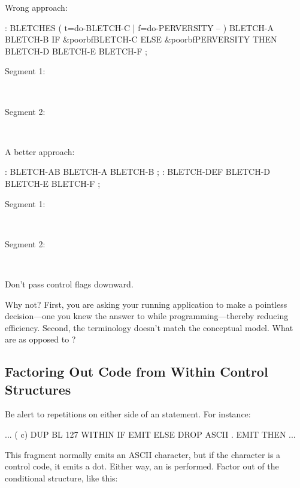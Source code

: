 \noindent Wrong approach:

\begin{Code}[commandchars=\&\{\}]
: BLETCHES  ( t=do-BLETCH-C | f=do-PERVERSITY -- ) 
   BLETCH-A  BLETCH-B  IF  &poorbf{BLETCH-C}  ELSE  &poorbf{PERVERSITY}
      THEN  BLETCH-D BLETCH-E BLETCH-F ;
\end{Code}

\begin{description}
\item[Segment 1:]~~ 
\item[Segment 2:]~~ 
\end{description}

\noindent A better approach:

\begin{Code}
: BLETCH-AB   BLETCH-A BLETCH-B ;
: BLETCH-DEF   BLETCH-D BLETCH-E BLETCH-F ;
\end{Code}

\begin{description}
\item[Segment 1:]~~ 
\item[Segment 2:]~~ 
\end{description}

\begin{tip}
Don't pass control flags downward.
\end{tip}
Why not? First, you are asking your running application to make a
pointless decision---one you knew the answer to while
programming---thereby reducing efficiency. Second, the terminology
doesn't match the conceptual model. What are 
as opposed to ?

\subsection{Factoring Out Code from Within Control Structures}

Be alert to repetitions on either side of an
 statement. For instance:

\begin{Code}
... ( c)  DUP  BL 127 WITHIN
       IF  EMIT  ELSE
       DROP  ASCII . EMIT   THEN ...
\end{Code}
This fragment normally emits an ASCII character, but if the character
is a control code, it emits a dot. Either way, an  is
performed. Factor  out of the conditional structure, like
this:

